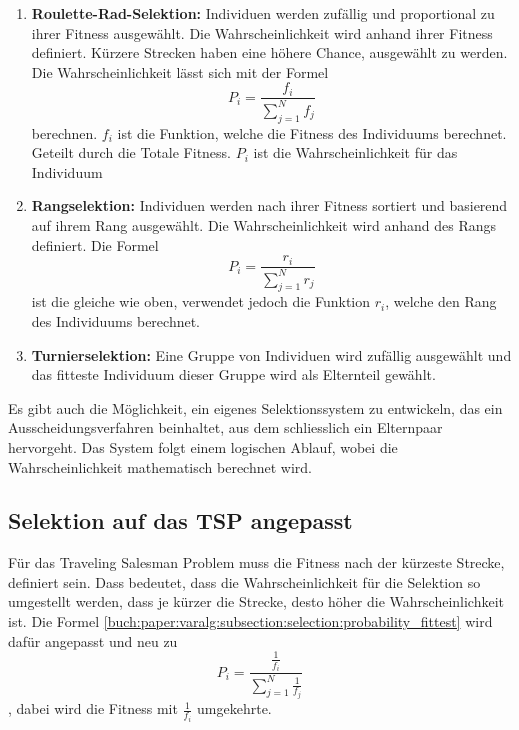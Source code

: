 \begin{enumerate}
    \item \textbf{Roulette-Rad-Selektion:} Individuen werden zufällig und
    proportional zu ihrer Fitness ausgewählt. Die Wahrscheinlichkeit wird 
    anhand ihrer Fitness definiert. Kürzere Strecken haben eine höhere Chance, 
    ausgewählt zu werden. Die Wahrscheinlichkeit lässt sich mit der Formel
    \begin{equation}
        P_i
        =
        \frac{f_i}{\sum_{j=1}^{N} f_j}
        \label{buch:paper:varalg:selection:probability_fittest}
    \end{equation}
    berechnen. \(f_i\) ist die Funktion, welche die Fitness des Individuums berechnet.
    Geteilt durch die Totale Fitness. \(P_i\) ist die Wahrscheinlichkeit für das Individuum
    \item \textbf{Rangselektion:} Individuen werden nach ihrer Fitness sortiert und basierend
    auf ihrem Rang ausgewählt. Die Wahrscheinlichkeit wird anhand des Rangs definiert. Die 
    Formel 
    \begin{equation}
        P_i
        =
        \frac{r_i}{\sum_{j=1}^{N} r_j}
        \label{buch:paper:varalg:selection:probability_rating}
    \end{equation}
    ist die gleiche wie oben, verwendet jedoch die Funktion \(r_i\), welche den 
    Rang des Individuums berechnet.
    \item \textbf{Turnierselektion:} Eine Gruppe von Individuen wird zufällig ausgewählt
    und das fitteste Individuum dieser Gruppe wird als Elternteil gewählt.
\end{enumerate}
Es gibt auch die Möglichkeit, ein eigenes Selektionssystem zu entwickeln, 
das ein Ausscheidungsverfahren beinhaltet, aus dem schliesslich ein 
Elternpaar hervorgeht. Das System folgt einem logischen Ablauf, wobei 
die Wahrscheinlichkeit mathematisch berechnet wird.

\subsection{Selektion auf das TSP angepasst
\label{buch:paper:varalg:subsection:selection_tsp}}
Für das Traveling Salesman Problem muss die Fitness nach der kürzeste Strecke,
definiert sein. Dass bedeutet, dass die Wahrscheinlichkeit für die Selektion
so umgestellt werden, dass je kürzer die Strecke, desto höher die Wahrscheinlichkeit
ist. Die Formel \ref{buch:paper:varalg:subsection:selection:probability_fittest} wird 
dafür angepasst und neu zu
\begin{equation}
    P_i
    =
    \frac{\frac{1}{f_i}}{\sum_{j=1}^{N} \frac{1}{f_j}}
    \label{buch:paper:varalg:selection:probability_fittest_tsp}
\end{equation}
, dabei wird die Fitness mit \(\frac{1}{f_i}\) umgekehrte.
